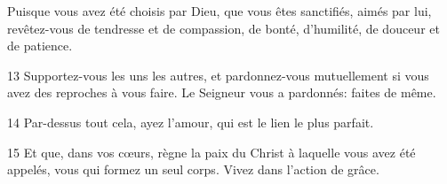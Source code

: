 Puisque vous avez été choisis par Dieu, que vous êtes sanctifiés, aimés par lui, revêtez-vous de tendresse et de compassion, de bonté, d’humilité, de douceur et de patience.

13 Supportez-vous les uns les autres, et pardonnez-vous mutuellement si vous avez des reproches à vous faire. Le Seigneur vous a pardonnés: faites de même.

14 Par-dessus tout cela, ayez l’amour, qui est le lien le plus parfait.

15 Et que, dans vos cœurs, règne la paix du Christ à laquelle vous avez été appelés, vous qui formez un seul corps. Vivez dans l’action de grâce.
